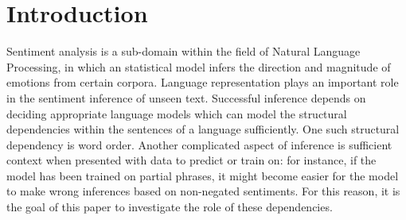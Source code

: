 \section{Introduction}
\label{sec: intro}
Sentiment analysis is a sub-domain within the field of Natural Language
Processing, in which an statistical model infers the direction and magnitude of
emotions from certain corpora. Language representation plays an important role
in the sentiment inference of unseen text. Successful inference depends on
deciding appropriate language models which can model the structural dependencies
within the sentences of a language sufficiently. One such structural dependency
is word order. Another complicated aspect of inference is sufficient context
when presented with data to predict or train on: for instance, if the model has
been trained on partial phrases, it might become easier for the model to make
wrong inferences based on non-negated sentiments. For this reason, it is the
goal of this paper to investigate the role of these dependencies.

